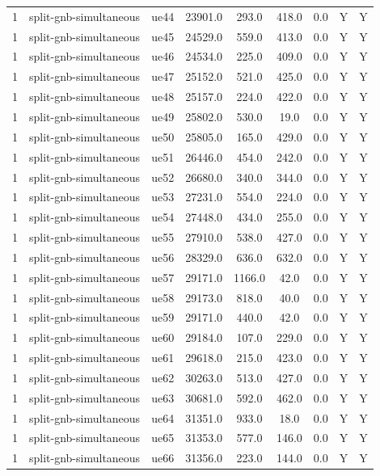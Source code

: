 \begin{table}[ht]
\begin{tabular}{|c|c|c|c|c|c|c|c|c|}
1 & split-gnb-simultaneous & ue44 & 23901.0 & 293.0 & 418.0 & 0.0 & Y & Y \\
1 & split-gnb-simultaneous & ue45 & 24529.0 & 559.0 & 413.0 & 0.0 & Y & Y \\
1 & split-gnb-simultaneous & ue46 & 24534.0 & 225.0 & 409.0 & 0.0 & Y & Y \\
1 & split-gnb-simultaneous & ue47 & 25152.0 & 521.0 & 425.0 & 0.0 & Y & Y \\
1 & split-gnb-simultaneous & ue48 & 25157.0 & 224.0 & 422.0 & 0.0 & Y & Y \\
1 & split-gnb-simultaneous & ue49 & 25802.0 & 530.0 & 19.0 & 0.0 & Y & Y \\
1 & split-gnb-simultaneous & ue50 & 25805.0 & 165.0 & 429.0 & 0.0 & Y & Y \\
1 & split-gnb-simultaneous & ue51 & 26446.0 & 454.0 & 242.0 & 0.0 & Y & Y \\
1 & split-gnb-simultaneous & ue52 & 26680.0 & 340.0 & 344.0 & 0.0 & Y & Y \\
1 & split-gnb-simultaneous & ue53 & 27231.0 & 554.0 & 224.0 & 0.0 & Y & Y \\
1 & split-gnb-simultaneous & ue54 & 27448.0 & 434.0 & 255.0 & 0.0 & Y & Y \\
1 & split-gnb-simultaneous & ue55 & 27910.0 & 538.0 & 427.0 & 0.0 & Y & Y \\
1 & split-gnb-simultaneous & ue56 & 28329.0 & 636.0 & 632.0 & 0.0 & Y & Y \\
1 & split-gnb-simultaneous & ue57 & 29171.0 & 1166.0 & 42.0 & 0.0 & Y & Y \\
1 & split-gnb-simultaneous & ue58 & 29173.0 & 818.0 & 40.0 & 0.0 & Y & Y \\
1 & split-gnb-simultaneous & ue59 & 29171.0 & 440.0 & 42.0 & 0.0 & Y & Y \\
1 & split-gnb-simultaneous & ue60 & 29184.0 & 107.0 & 229.0 & 0.0 & Y & Y \\
1 & split-gnb-simultaneous & ue61 & 29618.0 & 215.0 & 423.0 & 0.0 & Y & Y \\
1 & split-gnb-simultaneous & ue62 & 30263.0 & 513.0 & 427.0 & 0.0 & Y & Y \\
1 & split-gnb-simultaneous & ue63 & 30681.0 & 592.0 & 462.0 & 0.0 & Y & Y \\
1 & split-gnb-simultaneous & ue64 & 31351.0 & 933.0 & 18.0 & 0.0 & Y & Y \\
1 & split-gnb-simultaneous & ue65 & 31353.0 & 577.0 & 146.0 & 0.0 & Y & Y \\
1 & split-gnb-simultaneous & ue66 & 31356.0 & 223.0 & 144.0 & 0.0 & Y & Y \\

\end{tabular}
\end{table}
